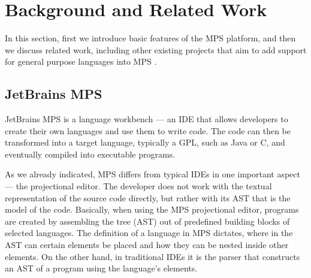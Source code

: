 \section{Background and Related Work}
\label{sect:BACKGRELWORK}

In this section, first we introduce basic features of the MPS platform, and then we discuss related work, including other existing projects that aim to add support for general purpose languages into MPS .

\subsection{JetBrains MPS}
\label{sect:MPS}




JetBrains MPS is a language workbench --- an IDE that allows developers to create their own languages and use them to write code.
The code can then be transformed into a target language, typically a GPL, such as Java or C, and eventually compiled into executable programs.

As we already indicated, MPS differs from typical IDEs in one important aspect --- the projectional editor.
The developer does not work with the textual representation of the source code directly, but rather with its AST that is the model of the code.
Basically, when using the MPS projectional editor, programs are created by assembling the tree (AST) out of predefined building blocks of selected languages.
The definition of a language in MPS dictates, where in the AST can certain elements be placed and how they can be nested inside other elements.
On the other hand, in traditional IDEs it is the parser that constructs an AST of a program using the language's elements.

